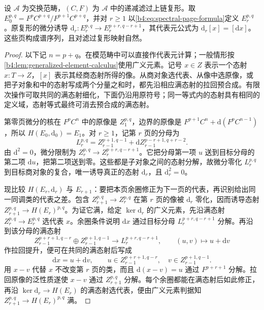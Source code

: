 \begin{theorem}\label{b4:thm:filtered-spectral-sequence}
	设 \(\mathcal A\) 为交换范畴，\((C,F)\) 为 \(\mathcal A\) 中的递减滤过上链复形。取 \(E_0^{p,q}=F^pC^{p+q}/F^{p+1}C^{p+q}\)，并对 \(r\ge1\) 以\cref{b4:eq:spectral-page-formula}定义 \(E_r^{p,q}\)。原复形的微分诱导 \(\mathrm d_r:E_r^{p,q}\to E_r^{p+r,q-r+1}\)，其代表元公式为 \(\mathrm{d}_r[x]=[\mathrm{d}x]\)。这些页构成谱序列，且对滤过复形映射自然。
\end{theorem}
\begin{proof}
	以下记 \(n=p+q\)。在模范畴中可以直接作代表元计算；一般情形按\cref{b4:lem:generalized-element-calculus}使用广义元素。记号 \(x\in Z\) 表示一个态射 \(x:T\to Z\)，\([x]\) 表示其经商态射所得的像。从商对象选代表、从像中选原像，或把子对象和中的态射写成两个分量之和时，都先沿相应满态射的拉回预合成。有限次操作可取共同的满态射细化，下面仍沿用原符号；同一等式内的态射具有相同的定义域，态射等式最终可消去预合成的满态射。

	第零页微分的核在 \(F^pC^n\) 中的原像是 \(Z_1^{p,q}\)，边界的原像是 \(F^{p+1}C^n+\mathrm d(F^pC^{n-1})\)，所以 \(H(E_0,\mathrm d_0)=E_1\)。对 \(r\ge1\)，记第 \(r\) 页的分母为
	\[
		L_r^{p,q}=Z_{r-1}^{p+1,q-1} +\mathrm d Z_{r-1}^{p-r+1,q+r-2}.
	\]
	由 \(\mathrm d^2=0\)，微分限制为 \(Z_r^{p,q}\to Z_r^{p+r,q-r+1}\)。它把分母第一项 \(u\) 送到目标分母的第二项 \(\mathrm d u\)，把第二项送到零。这些都是子对象之间的态射分解，故微分零化 \(L_r^{p,q}\) 到目标商对象的复合，唯一诱导真正的态射 \(\mathrm d_r\)，且 \(\mathrm d_r^2=0\)。

	现比较 \(H(E_r,\mathrm{d}_r)\) 与 \(E_{r+1}\)：要把本页余圈修正为下一页的代表，再识别给出同一同调类的代表之差。包含 \(Z_{r+1}^{p,q}\to Z_r^{p,q}\) 在第 \(r\) 页的像被 \(\mathrm d_r\) 零化，因而诱导态射 \(Z_{r+1}^{p,q}\to H(E_r)^{p,q}\)。为证它满，给定 \(\ker\mathrm d_r\) 的广义元素，先沿满态射 \(Z_r^{p,q}\to E_r^{p,q}\) 选代表 \(x\)。余圈条件说明 \(\mathrm d x\) 通过目标分母 \(L_r^{p+r,q-r+1}\) 分解。再沿到该分母的满态射
	\[
		Z_{r-1}^{p+r+1,q-r}\oplus Z_{r-1}^{p+1,q-1} \longrightarrow L_r^{p+r,q-r+1},\qquad (u,v)\longmapsto u+\mathrm d v
	\]
	作拉回提升，便可在共同的满态射后写成
	\[
		\mathrm{d}x=u+\mathrm{d}v,\qquad u\in Z_{r-1}^{p+r+1,q-r},\quad v\in Z_{r-1}^{p+1,q-1}.
	\]
	用 \(x-v\) 代替 \(x\) 不改变第 \(r\) 页的类，而且 \(\mathrm{d}(x-v)=u\) 通过 \(F^{p+r+1}\) 分解。拉回原像的泛性质遂使 \(x-v\) 通过 \(Z_{r+1}^{p,q}\) 分解。每个余圈都能在满态射后如此修正，再沿 \(\ker\mathrm d_r\to H(E_r)\) 的满态射选代表，便由广义元素判据知 \(Z_{r+1}^{p,q}\to H(E_r)^{p,q}\) 满。


\end{proof}
